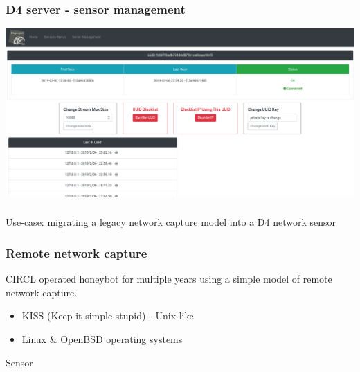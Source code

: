 \documentclass{beamer}
\begin{document}
\begin{frame}
        \frametitle{D4 server - sensor management}
        \includegraphics[scale=0.18]{d4-2.png}
\end{frame}



\begin{frame}
        \frametitle{}
        {\center Use-case: migrating a legacy network capture model into a D4 network sensor
}
\end{frame}


\begin{frame}
\frametitle{Remote network capture}
    CIRCL operated honeybot for multiple years using a simple model of remote network capture.
    \begin{definition}[Principle]
        \begin{itemize}
            \item KISS (Keep it simple stupid) - Unix-like
            \item Linux \& OpenBSD operating systems
        \end{itemize}
    \end{definition}

    \begin{block}{Sensor}
    
    \end{block}
\end{frame}
\end{document}
